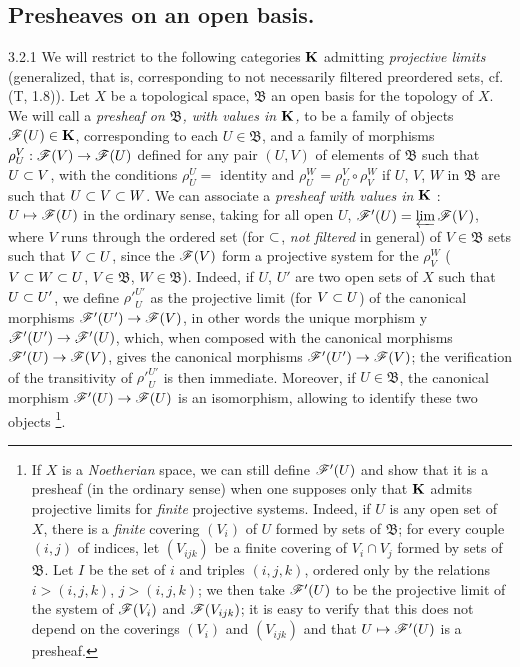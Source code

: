 \documentclass[../main.tex]{subfiles}
\begin{document}
\subsection{Presheaves on an open basis.}

\begin{cx}{3.2.1}
We will restrict to the following categories $\mathbf{K}$ admitting
\emph{projective limits} (generalized, that is, corresponding to not necessarily filtered preordered sets,
cf. (T, 1.8)). Let $X$ be a topological space, $\mathfrak{B}$ an open basis
for the topology of $X$. We will call a \emph{presheaf on $\mathfrak{B}$, with values in $\mathbf{K}$,} to be
a family of objects $\mathscr{F}(U)\in\mathbf{K}$, corresponding to each $U\in\mathfrak{B}$, and a family of morphisms
$\rho_U^V:\mathscr{F}(V)\to\mathscr{F}(U)$ defined for any pair $(U,V)$ of elements of $\mathfrak{B}$ such that $U\subset V$,
with the conditions $\rho_U^U=$ identity and $\rho_U^W=\rho_U^V\circ\rho_V^W$ if $U$, $V$, $W$ in
$\mathfrak{B}$ are such that $U\subset V\subset W$. We can associate a \emph{presheaf with values in} $\mathbf{K}$ : $U\mapsto\mathscr{F}(U)$
in the ordinary sense, taking for all open $U$, $\mathscr{F}'(U)=\varprojlim\mathscr{F}(V)$, where $V$ runs through
the ordered set (for $\subset$, \emph{not filtered} in general) of $V\in\mathfrak{B}$ sets such that $V\subset U$, since
the $\mathscr{F}(V)$ form a projective system for the $\rho_V^W$ ($V\subset W\subset U$, $V\in\mathfrak{B}$, $W\in\mathfrak{B}$).
Indeed, if $U$, $U'$ are two open sets of $X$ such that $U\subset U'$, we define ${\rho'}_U^{U'}$ as the
projective limit (for $V\subset U$) of the canonical morphisms $\mathscr{F}'(U')\to\mathscr{F}(V)$, in other words
the unique morphism y $\mathscr{F}'(U')\to\mathscr{F}'(U)$, which, when composed with the canonical morphisms
$\mathscr{F}'(U)\to\mathscr{F}(V)$, gives the canonical morphisms $\mathscr{F}'(U')\to\mathscr{F}(V)$; the verification of
the transitivity of ${\rho'}_U^{U'}$ is then immediate. Moreover, if $U\in\mathfrak{B}$,
the canonical morphism $\mathscr{F}'(U)\to\mathscr{F}(U)$ is an isomorphism, allowing to identify these two objects
\footnote{
If $X$ is a \emph{Noetherian} space, we can still define $\mathscr{F}'(U)$ and show that it is a presheaf (in the
ordinary sense) when one supposes only that $\mathbf{K}$ admits projective limits for \emph{finite} projective systems. Indeed,
if $U$ is any open set of $X$, there is a \emph{finite} covering $(V_i)$ of $U$ formed by sets of $\mathfrak{B}$; for every
couple $(i,j)$ of indices, let $(V_{ijk})$ be a finite covering of $V_i\cap V_j$ formed by sets of $\mathfrak{B}$. Let $I$ be the set
of $i$ and triples $(i,j,k)$, ordered only by the relations $i>(i,j,k)$, $j>(i,j,k)$; we then take $\mathscr{F}'(U)$ to be
the projective limit of the system of $\mathscr{F}(V_i)$ and $\mathscr{F}(V_{ijk})$; it is easy to verify that this does not depend on the
coverings $(V_i)$ and $(V_{ijk})$ and that $U\mapsto\mathscr{F}'(U)$ is a presheaf.}.
\end{cx}
\end{document}
